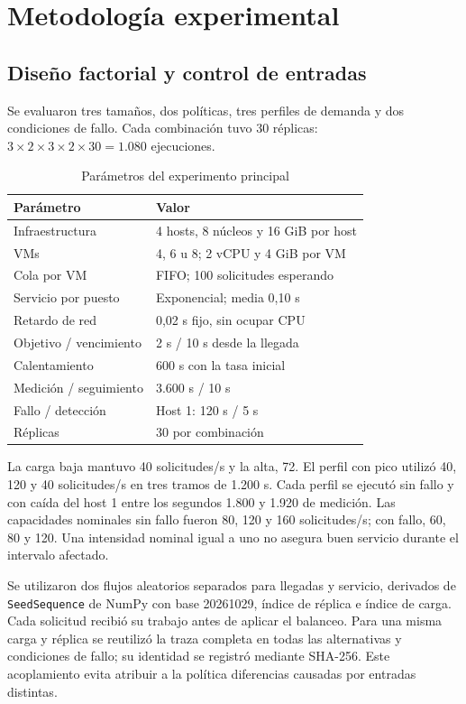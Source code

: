 \section{Metodología experimental}
\subsection{Diseño factorial y control de entradas}
Se evaluaron tres tamaños, dos políticas, tres perfiles de demanda y dos condiciones de fallo. Cada combinación tuvo 30 réplicas: $3\times2\times3\times2\times30=1.080$ ejecuciones.

\begin{table}[t]
\caption{Parámetros del experimento principal}
\label{tab:parametros}
\centering\footnotesize
\begin{tabularx}{\columnwidth}{@{}p{}Y@{}}\toprule
Parámetro & Valor\\\midrule
Infraestructura & 4 hosts, 8 núcleos y 16 GiB por host\\
VMs & 4, 6 u 8; 2 vCPU y 4 GiB por VM\\
Cola por VM & FIFO; 100 solicitudes esperando\\
Servicio por puesto & Exponencial; media 0,10 s\\
Retardo de red & 0,02 s fijo, sin ocupar CPU\\
Objetivo / vencimiento & 2 s / 10 s desde la llegada\\
Calentamiento & 600 s con la tasa inicial\\
Medición / seguimiento & 3.600 s / 10 s\\
Fallo / detección & Host 1: 120 s / 5 s\\
Réplicas & 30 por combinación\\\bottomrule
\end{tabularx}
\end{table}

La carga baja mantuvo 40 solicitudes/s y la alta, 72. El perfil con pico utilizó 40, 120 y 40 solicitudes/s en tres tramos de 1.200 s. Cada perfil se ejecutó sin fallo y con caída del host 1 entre los segundos 1.800 y 1.920 de medición. Las capacidades nominales sin fallo fueron 80, 120 y 160 solicitudes/s; con fallo, 60, 80 y 120. Una intensidad nominal igual a uno no asegura buen servicio durante el intervalo afectado.

Se utilizaron dos flujos aleatorios separados para llegadas y servicio, derivados de \texttt{SeedSequence} de NumPy con base 20261029, índice de réplica e índice de carga. Cada solicitud recibió su trabajo antes de aplicar el balanceo. Para una misma carga y réplica se reutilizó la traza completa en todas las alternativas y condiciones de fallo; su identidad se registró mediante SHA-256. Este acoplamiento evita atribuir a la política diferencias causadas por entradas distintas.

